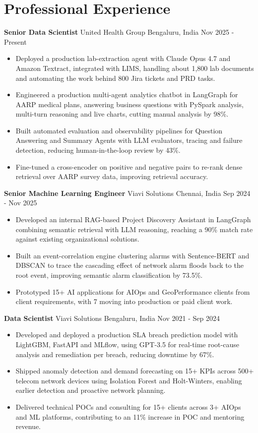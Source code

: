 \documentclass[10pt,a4paper]{article}
\newcommand{\role}[4]{\textbf{#1} \textbar{} #2 \hfill #3 \textbar{} #4\par}
\begin{document}
\section{Professional Experience}
\role{Senior Data Scientist}{United Health Group}{Bengaluru, India}{Nov 2025 - Present}
\begin{itemize}
  \item Deployed a production lab-extraction agent with Claude Opus 4.7 and Amazon Textract, integrated with LIMS, handling about 1,800 lab documents and automating the work behind 800 Jira tickets and PRD tasks.
  \item Engineered a production multi-agent analytics chatbot in LangGraph for AARP medical plans, answering business questions with PySpark analysis, multi-turn reasoning and live charts, cutting manual analysis by 98\%.
  \item Built automated evaluation and observability pipelines for Question Answering and Summary Agents with LLM evaluators, tracing and failure detection, reducing human-in-the-loop review by 43\%.
  \item Fine-tuned a cross-encoder on positive and negative pairs to re-rank dense retrieval over AARP survey data, improving retrieval accuracy.
\end{itemize}
\vspace{3pt}
\role{Senior Machine Learning Engineer}{Viavi Solutions}{Chennai, India}{Sep 2024 - Nov 2025}
\begin{itemize}
  \item Developed an internal RAG-based Project Discovery Assistant in LangGraph combining semantic retrieval with LLM reasoning, reaching a 90\% match rate against existing organizational solutions.
  \item Built an event-correlation engine clustering alarms with Sentence-BERT and DBSCAN to trace the cascading effect of network alarm floods back to the root event, improving semantic alarm classification by 73.5\%.
  \item Prototyped 15+ AI applications for AIOps and GeoPerformance clients from client requirements, with 7 moving into production or paid client work.
\end{itemize}
\vspace{3pt}
\role{Data Scientist}{Viavi Solutions}{Bengaluru, India}{Nov 2021 - Sep 2024}
\begin{itemize}
  \item Developed and deployed a production SLA breach prediction model with LightGBM, FastAPI and MLflow, using GPT-3.5 for real-time root-cause analysis and remediation per breach, reducing downtime by 67\%.
  \item Shipped anomaly detection and demand forecasting on 15+ KPIs across 500+ telecom network devices using Isolation Forest and Holt-Winters, enabling earlier detection and proactive network planning.
  \item Delivered technical POCs and consulting for 15+ clients across 3+ AIOps and ML platforms, contributing to an 11\% increase in POC and mentoring revenue.
\end{itemize}
\end{document}
